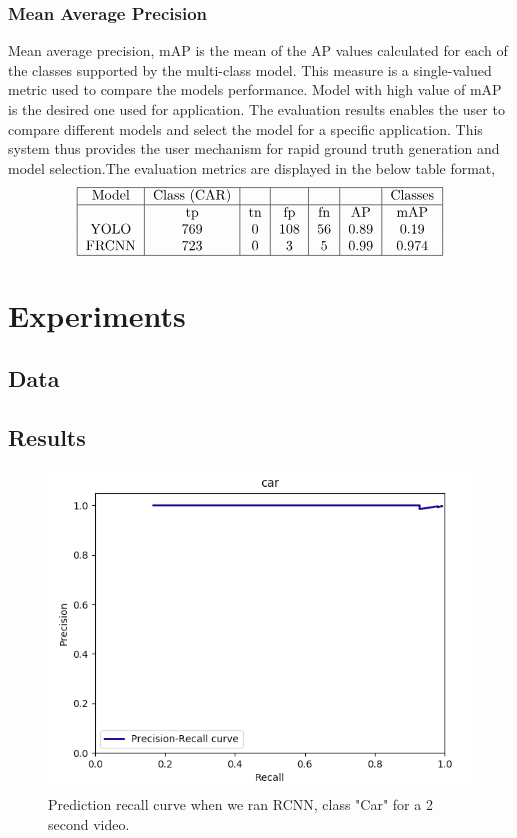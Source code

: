 \documentclass[conference]{IEEEtran}
\newcommand{\figwidthb}{0.80\linewidth}
\begin{document}
\subsubsection{Mean Average Precision}
	Mean average precision, {mAP} is the mean of the {AP} values calculated for each of the classes supported by the multi-class model. This measure is a single-valued metric used to compare the models performance. Model with high value of {mAP} is the desired one used for application. The evaluation results enables the user to compare different models and select the model for a specific application. This system thus provides the user mechanism for rapid ground truth generation and model selection.The evaluation metrics are displayed in the below table format,
\begin{align}
\begin{tabular}{| c | c | c | c | c | c | c | }
\hline
Model & Class (CAR) & & & & & Classes \\ 
\hline 
     & tp & tn & fp & fn & AP & mAP \\ 
YOLO & 769 & 0 &  108 & 56 & 0.89 & 0.19  \\
FRCNN & 723 & 0 & 3 & 5 & 0.99 & 0.974 \\
\hline
\end{tabular}
\end{align}




\section{Experiments} \label{sec.experiment}
\subsection{Data} \label{sec.data}
\subsection{Results} \label{sec.results}
\begin{figure}
\centering
\includegraphics[width=\figwidthb]{fig/pr_rcnn.png}
\caption{Prediction recall curve when we ran RCNN, class "Car" for a 2 second video.} \label{fig.structure}
\end{figure}
\end{document}
